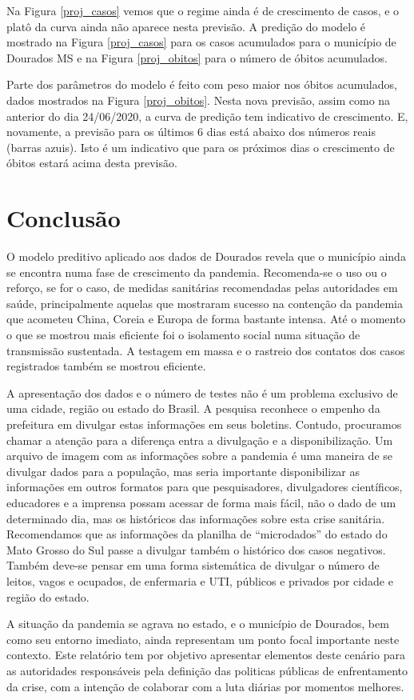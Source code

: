 \documentclass[12pt]{article}
\begin{document}
Na Figura \ref{proj_casos} vemos que o regime ainda é de crescimento de casos, e o platô da curva ainda não aparece nesta previsão. A predição do modelo é mostrado na Figura \ref{proj_casos} para os casos acumulados para o município de Dourados MS e na Figura \ref{proj_obitos} para o número de óbitos acumulados.

Parte dos parâmetros do modelo é feito com peso maior nos óbitos acumulados, dados mostrados na Figura \ref{proj_obitos}. Nesta nova previsão, assim como na anterior do dia 24/06/2020, a curva de predição tem indicativo de crescimento. E, novamente, a previsão para os últimos 6 dias está abaixo dos números reais (barras azuis). Isto é um indicativo que para os próximos dias o crescimento de óbitos estará acima desta previsão.   

\section{Conclusão}\label{conc}

O modelo preditivo aplicado aos dados de Dourados revela que o município ainda se encontra numa fase de crescimento da pandemia. Recomenda-se o uso ou o reforço, se for o caso, de medidas sanitárias recomendadas pelas autoridades em saúde, principalmente aquelas que mostraram sucesso na contenção da pandemia que acometeu China, Coreia e Europa de forma bastante intensa. Até o momento o que se mostrou mais eficiente foi o isolamento social numa situação de transmissão sustentada. A testagem em massa e o rastreio dos contatos dos casos registrados também se mostrou eficiente.

A apresentação dos dados e o número de testes não é um problema exclusivo de uma cidade, região ou estado do Brasil. A pesquisa reconhece o empenho da prefeitura em divulgar estas informações em seus boletins. Contudo, procuramos chamar a atenção para a diferença entra a divulgação e a disponibilização. Um arquivo de imagem com as informações sobre a pandemia é uma maneira de se divulgar dados para a população, mas seria importante disponibilizar as informações em outros formatos para que pesquisadores, divulgadores científicos, educadores e a imprensa possam acessar de forma mais fácil, não o dado de um determinado dia, mas os históricos das informações sobre esta crise sanitária. Recomendamos que as informações da planilha de ``microdados'' do estado do Mato Grosso do Sul passe a divulgar também o histórico dos casos negativos. Também deve-se pensar em uma forma sistemática de divulgar o número de leitos, vagos e ocupados, de enfermaria e UTI, públicos e privados por cidade e região do estado.


A situação da pandemia se agrava no estado, e o município de Dourados, bem como seu entorno imediato, ainda representam um ponto focal importante neste contexto. Este relatório tem por objetivo apresentar elementos deste cenário para as autoridades responsáveis pela definição das politicas públicas de enfrentamento da crise, com a intenção de colaborar com a luta diárias por momentos melhores.



\end{document}
